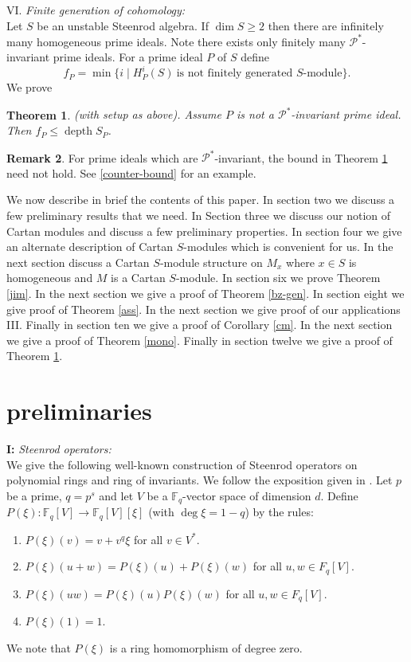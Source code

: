 \documentclass{amsart}
\newcommand{\F}{\mathbb{F} }
\newcommand{\Pc}{\mathcal{P} }
\newcommand{\rt}{\rightarrow}
\newcommand{\depth}{\operatorname{depth}}
\theoremstyle{plain}
\newtheorem{theorem}{Theorem}[section]
\theoremstyle{definition}
\newtheorem{remark}[theorem]{Remark}
\theoremstyle{remark}
\begin{document}
VI. \emph{Finite generation of cohomology:}\\
Let $S$ be an unstable Steenrod algebra. If $\dim S \geq 2$ then there are  infinitely many homogeneous prime ideals. Note there exists only finitely many  $\Pc^*$-invariant prime ideals.
For a prime ideal $P$ of $S$ define
$$f_P = \min \{ i \mid H^i_P(S) \ \text{is not finitely generated $S$-module} \}. $$
We prove
\begin{theorem}
\label{bound}(with setup as above). Assume $P$ is not a $\Pc^*$-invariant prime ideal. Then $f_P \leq \depth S_P$.
\end{theorem}
\begin{remark}
For prime ideals which are  $\Pc^*$-invariant, the bound in Theorem \ref{bound} need not hold. See \ref{counter-bound} for an example.
\end{remark}

We now describe in brief the contents of this paper.  In section two we discuss a few preliminary results that we need. In Section three we discuss our notion of Cartan modules and discuss a few preliminary properties. In section four we give an alternate description of Cartan $S$-modules which is convenient for us.
In the next section
 discuss a Cartan $S$-module structure on $M_x$ where $x \in S$ is homogeneous and $M$ is a Cartan $S$-module.  In section six we 
    prove Theorem \ref{jim}. In the next section we give a proof of Theorem \ref{bz-gen}. In section eight we give proof of Theorem \ref{ass}. In the next section we give proof of our applications III. Finally in section ten we give a proof of Corollary \ref{cm}. In the next section we give a proof of Theorem \ref{mono}. Finally in section twelve we give a proof of Theorem \ref{bound}.


\section{preliminaries}
\textbf{I:} \emph{Steenrod operators:}\\
We give the following well-known construction of Steenrod operators on polynomial rings and ring of invariants.
We follow the exposition given in \cite{SL}.
\s Let $p$ be a prime, $q = p^s$ and let $V$ be a $\F_q$-vector space of dimension $d$.
Define $P(\xi)\colon \F_q[V] \rt \F_q[V][\xi]$ (with $\deg \xi = 1-q$) by the rules:
\begin{enumerate}
  \item $P(\xi)(v)  = v + v^q\xi$  for all $v \in  V^*$.
  \item $P(\xi)(u + w) = P(\xi)(u) + P(\xi)(w)$ for all $u,w \in F_q[V]$.
  \item $P(\xi)(uw) = P(\xi)(u)P(\xi)(w)$ for all $u,w \in F_q[V]$.
  \item $P(\xi)(1) = 1$.
   \end{enumerate}
  We note that $P(\xi)$ is a ring homomorphism of degree zero.
\end{document}
